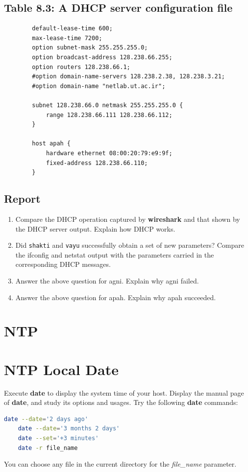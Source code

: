 \documentclass[10pt,a4paper]{article}
\numberwithin{equation}{section}
\numberwithin{figure}{section}
\numberwithin{table}{section}
\begin{document}
    \subsection*{Table 8.3: A DHCP server configuration file}
    \begin{verbatim}
        default-lease-time 600;
        max-lease-time 7200;
        option subnet-mask 255.255.255.0;
        option broadcast-address 128.238.66.255;
        option routers 128.238.66.1;
        #option domain-name-servers 128.238.2.38, 128.238.3.21;
        #option domain-name "netlab.ut.ac.ir";

        subnet 128.238.66.0 netmask 255.255.255.0 {
            range 128.238.66.111 128.238.66.112;
        }

        host apah {
            hardware ethernet 08:00:20:79:e9:9f;
            fixed-address 128.238.66.110;
        }
    \end{verbatim}

    \subsection*{Report}
    \begin{enumerate}
        \item Compare the DHCP operation captured by \textbf{wireshark} and that shown by the DHCP server output.
        Explain how DHCP works.
        \item Did \texttt{shakti} and \texttt{vayu} successfully obtain a set of new parameters?
        Compare the ifconfig and netstat output with the parameters carried in the corresponding DHCP messages.
        \item Answer the above question for agni.
        Explain why agni failed.
        \item Answer the above question for apah.
        Explain why apah succeeded.
    \end{enumerate}

    \section*{NTP}
    \section{NTP Local Date}
    Execute \textbf{date} to display the system time of your host. Display the manual page of \textbf{date}, and study its options and usages.
    Try the following \textbf{date} commands: \\
    \begin{lstlisting}[language=bash,
        basicstyle=\ttfamily,
        showstringspaces=false,
        commentstyle=\color{green},
        keywordstyle=\color{black}]
    date --date='2 days ago'
    date --date='3 months 2 days'
    date --set='+3 minutes'
    date -r file_name
    \end{lstlisting}
    You can choose any file in the current directory for the \textit{file\_name} parameter.
\end{document}
